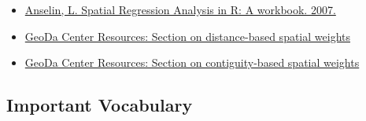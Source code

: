 \documentclass[
]{book}
\providecommand{\tightlist}{%
  \setlength{\itemsep}{0pt}\setlength{\parskip}{0pt}}
\begin{document}
\begin{itemize}
\tightlist
\item
  \href{https://dces.wisc.edu/wp-content/uploads/sites/128/2013/08/W14_Anselin2007.pdf}{Anselin, L. Spatial Regression Analysis in R: A workbook. 2007.}
\item
  \href{https://geodacenter.github.io/workbook/4b_dist_weights/lab4b.html}{GeoDa Center Resources: Section on distance-based spatial weights}
\item
  \href{https://geodacenter.github.io/workbook/4a_contig_weights/lab4a.html}{GeoDa Center Resources: Section on contiguity-based spatial weights}
\end{itemize}

\hypertarget{important-vocabulary-4}{%
\subsection{Important Vocabulary}\label{important-vocabulary-4}}

 
  \providecommand{\huxb}[2]{\arrayrulecolor[RGB]{#1}\global\arrayrulewidth=#2pt}
  \providecommand{\huxvb}[2]{\color[RGB]{#1}\vrule width #2pt}
  \providecommand{\huxtpad}[1]{\rule{0pt}{#1}}
  \providecommand{\huxbpad}[1]{\rule[-#1]{0pt}{#1}}
\end{document}
